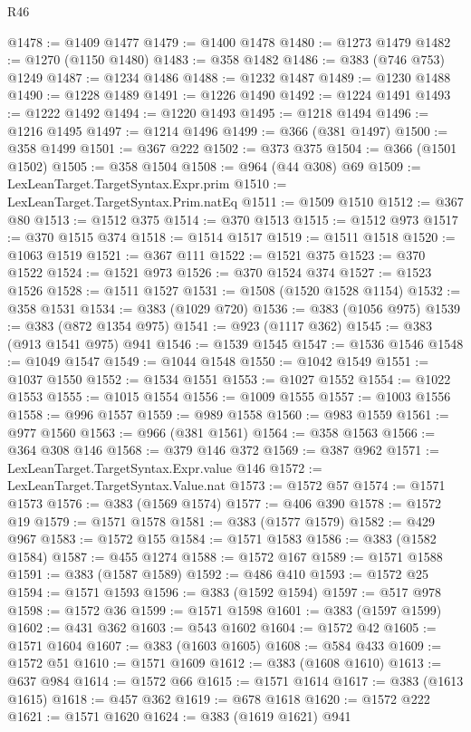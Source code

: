 \begin{lexlean}{R46}
\begin{coremodule}
@1478 := @1409 @1477
@1479 := @1400 @1478
@1480 := @1273 @1479
@1482 := @1270 (@1150 @1480)
@1483 := @358 @1482
@1486 := @383 (@746 @753) @1249
@1487 := @1234 @1486
@1488 := @1232 @1487
@1489 := @1230 @1488
@1490 := @1228 @1489
@1491 := @1226 @1490
@1492 := @1224 @1491
@1493 := @1222 @1492
@1494 := @1220 @1493
@1495 := @1218 @1494
@1496 := @1216 @1495
@1497 := @1214 @1496
@1499 := @366 (@381 @1497)
@1500 := @358 @1499
@1501 := @367 @222
@1502 := @373 @375
@1504 := @366 (@1501 @1502)
@1505 := @358 @1504
@1508 := @964 (@44 @308) @69
@1509 := LexLeanTarget.TargetSyntax.Expr.prim
@1510 := LexLeanTarget.TargetSyntax.Prim.natEq
@1511 := @1509 @1510
@1512 := @367 @80
@1513 := @1512 @375
@1514 := @370 @1513
@1515 := @1512 @973
@1517 := @370 @1515 @374
@1518 := @1514 @1517
@1519 := @1511 @1518
@1520 := @1063 @1519
@1521 := @367 @111
@1522 := @1521 @375
@1523 := @370 @1522
@1524 := @1521 @973
@1526 := @370 @1524 @374
@1527 := @1523 @1526
@1528 := @1511 @1527
@1531 := @1508 (@1520 @1528 @1154)
@1532 := @358 @1531
@1534 := @383 (@1029 @720)
@1536 := @383 (@1056 @975)
@1539 := @383 (@872 @1354 @975)
@1541 := @923 (@1117 @362)
@1545 := @383 (@913 @1541 @975) @941
@1546 := @1539 @1545
@1547 := @1536 @1546
@1548 := @1049 @1547
@1549 := @1044 @1548
@1550 := @1042 @1549
@1551 := @1037 @1550
@1552 := @1534 @1551
@1553 := @1027 @1552
@1554 := @1022 @1553
@1555 := @1015 @1554
@1556 := @1009 @1555
@1557 := @1003 @1556
@1558 := @996 @1557
@1559 := @989 @1558
@1560 := @983 @1559
@1561 := @977 @1560
@1563 := @966 (@381 @1561)
@1564 := @358 @1563
@1566 := @364 @308 @146
@1568 := @379 @146 @372
@1569 := @387 @962
@1571 := LexLeanTarget.TargetSyntax.Expr.value @146
@1572 := LexLeanTarget.TargetSyntax.Value.nat
@1573 := @1572 @57
@1574 := @1571 @1573
@1576 := @383 (@1569 @1574)
@1577 := @406 @390
@1578 := @1572 @19
@1579 := @1571 @1578
@1581 := @383 (@1577 @1579)
@1582 := @429 @967
@1583 := @1572 @155
@1584 := @1571 @1583
@1586 := @383 (@1582 @1584)
@1587 := @455 @1274
@1588 := @1572 @167
@1589 := @1571 @1588
@1591 := @383 (@1587 @1589)
@1592 := @486 @410
@1593 := @1572 @25
@1594 := @1571 @1593
@1596 := @383 (@1592 @1594)
@1597 := @517 @978
@1598 := @1572 @36
@1599 := @1571 @1598
@1601 := @383 (@1597 @1599)
@1602 := @431 @362
@1603 := @543 @1602
@1604 := @1572 @42
@1605 := @1571 @1604
@1607 := @383 (@1603 @1605)
@1608 := @584 @433
@1609 := @1572 @51
@1610 := @1571 @1609
@1612 := @383 (@1608 @1610)
@1613 := @637 @984
@1614 := @1572 @66
@1615 := @1571 @1614
@1617 := @383 (@1613 @1615)
@1618 := @457 @362
@1619 := @678 @1618
@1620 := @1572 @222
@1621 := @1571 @1620
@1624 := @383 (@1619 @1621) @941

\end{coremodule}
\end{lexlean}
